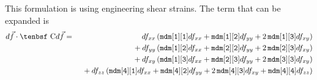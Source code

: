 \documentclass[11pt]{article}
\def\C{\hbox{\tenbsf C}}
\def\code#1{{\small\tt #1}}
\def\df{d \vec{f}}
\begin{document}
This formulation is using engineering shear strains. The term that can be expanded is
\begin{eqnarray}
        \df\cdot \C\df & = &  df_{xx}\left( \code{mdm[1][1]}df_{xx} + \code{mdm[1][2]}df_{yy} 
                                                      + 2\thinspace\code{mdm[1][3]}df_{xy} \right)
 \nonumber\\
&&\ \mbox{}
                           +df_{yy}\left( \code{mdm[1][2]}df_{xx} + \code{mdm[2][2]}df_{yy} 
                                                      + 2\thinspace\code{mdm[2][3]}df_{xy} \right)
\nonumber\\
&&\ \mbox{}
                           + df_{xy}\left(\code{mdm[1][3]}df_{xx} + \code{mdm[2][3]}df_{yy} 
                                                      + 2\thinspace\code{mdm[3][3]}df_{xy} \right)
\nonumber\\
&&\ \mbox{}
                           + df_{zz}\left(\code{mdm[4][1]}df_{xx} + \code{mdm[4][2]}df_{yy} 
                                                      + 2\thinspace\code{mdm[4][3]}df_{xy}  + \code{mdm[4][4]}df_{zz} \right) 
\end{eqnarray}
 
\end{document}
